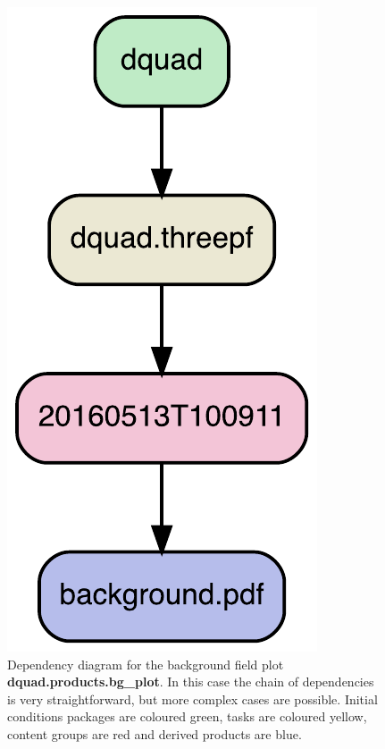 \documentclass[11pt,a4paper]{article}
\newcommand{\repoobject}[1]{{\ttfamily\bfseries\small #1}}
\begin{document}
\begin{figure}
	\begin{center}
		\includegraphics[scale=0.5]{DependencyDiagrams/bg-plot}
	\end{center}
	\caption{\label{fig:bg-dependencies}Dependency diagram for
	the background field plot \repoobject{dquad.products.bg\_plot}.
	In this case the chain of dependencies is very straightforward, but
	more complex cases are possible. Initial conditions packages are coloured
	green, tasks are coloured yellow, content groups are red and
	derived products are blue.}
\end{figure}
\end{document}
